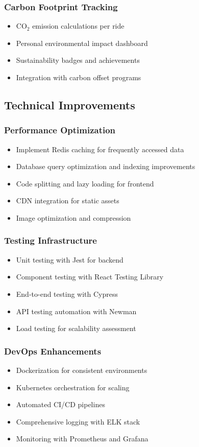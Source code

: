 \documentclass[12pt,a4paper]{article}
\begin{document}
\subsubsection{Carbon Footprint Tracking}
\begin{itemize}
    \item CO$_2$ emission calculations per ride
    \item Personal environmental impact dashboard
    \item Sustainability badges and achievements
    \item Integration with carbon offset programs
\end{itemize}

\subsection{Technical Improvements}

\subsubsection{Performance Optimization}
\begin{itemize}
    \item Implement Redis caching for frequently accessed data
    \item Database query optimization and indexing improvements
    \item Code splitting and lazy loading for frontend
    \item CDN integration for static assets
    \item Image optimization and compression
\end{itemize}

\subsubsection{Testing Infrastructure}
\begin{itemize}
    \item Unit testing with Jest for backend
    \item Component testing with React Testing Library
    \item End-to-end testing with Cypress
    \item API testing automation with Newman
    \item Load testing for scalability assessment
\end{itemize}

\subsubsection{DevOps Enhancements}
\begin{itemize}
    \item Dockerization for consistent environments
    \item Kubernetes orchestration for scaling
    \item Automated CI/CD pipelines
    \item Comprehensive logging with ELK stack
    \item Monitoring with Prometheus and Grafana
\end{itemize}
\end{document}
